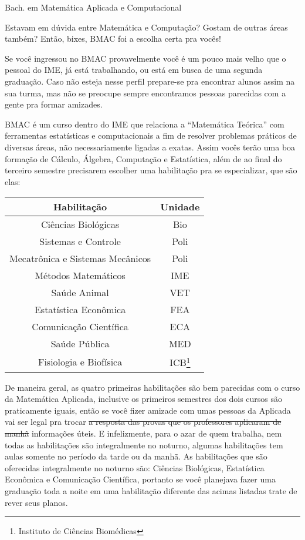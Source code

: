 \begin{subsecao}{Bach. em Matemática Aplicada e Computacional}

Estavam em dúvida entre Matemática e Computação? Gostam de outras áreas também?
Então, bixes, BMAC foi a escolha certa pra vocês!

Se você ingressou no BMAC provavelmente você é um pouco mais velho que o pessoal
do IME, já está trabalhando, ou está em busca de uma segunda graduação. Caso não
esteja nesse perfil prepare-se pra encontrar alunos assim na sua turma, mas não
se preocupe sempre encontramos pessoas parecidas com a gente pra formar
amizades.

BMAC é um curso dentro do IME que relaciona a ``Matemática Teórica'' com
ferramentas estatísticas e computacionais a fim de resolver problemas práticos
de diversas áreas, não necessariamente ligadas a exatas. Assim vocês terão uma
boa formação de Cálculo, Álgebra, Computação e Estatística, além de ao final do
terceiro semestre precisarem escolher uma habilitação pra se especializar, que
são elas:

\begin {center}
  \begin {tabular}{|c|c|}
    \hline
    Habilitação & Unidade \\
    \hline
    Ciências Biológicas & Bio\\
    Sistemas e Controle & Poli\\
    Mecatrônica e Sistemas Mecânicos & Poli\\
    Métodos Matemáticos & IME\\
    Saúde Animal & VET \\
    Estatística Econômica & FEA \\
    Comunicação Científica & ECA \\
    Saúde Pública & MED \\
    Fisiologia e Biofísica & ICB\footnote{Instituto de Ciências Biomédicas} \\
    \hline
  \end {tabular}
\end {center}

De maneira geral, as quatro primeiras habilitações são bem parecidas com o
curso da Matemática Aplicada, inclusive os primeiros semestres dos dois cursos
são praticamente iguais, então se você fizer amizade com umas pessoas da
Aplicada vai ser legal pra trocar \sout{a resposta das provas que os
professores aplicaram de manhã} informações úteis. E infelizmente, para o azar
de quem trabalha, nem todas as habilitações são integralmente no noturno,
algumas habilitações tem aulas somente no período da tarde ou da manhã. As
habilitações que são oferecidas integralmente no noturno são: Ciências
Biológicas, Estatística Econômica e Comunicação Científica, portanto se você
planejava fazer uma graduação toda a noite em uma habilitação diferente das
acimas listadas trate de rever seus planos.


\end{subsecao}
